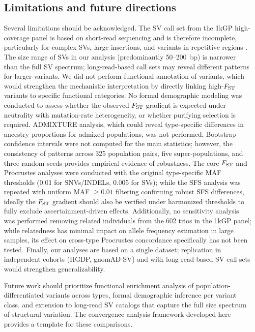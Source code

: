 \subsection*{Limitations and future directions}

Several limitations should be acknowledged. The SV call set from the 1kGP high-coverage panel is based on short-read sequencing and is therefore incomplete, particularly for complex SVs, large insertions, and variants in repetitive regions \citep{ho2020}. The size range of SVs in our analysis (predominantly 50--200~bp) is narrower than the full SV spectrum; long-read-based call sets may reveal different patterns for larger variants. We did not perform functional annotation of variants, which would strengthen the mechanistic interpretation by directly linking high-$F_\mathrm{ST}$ variants to specific functional categories. No formal demographic modeling was conducted to assess whether the observed $F_\mathrm{ST}$ gradient is expected under neutrality with mutation-rate heterogeneity, or whether purifying selection is required. ADMIXTURE analysis, which could reveal type-specific differences in ancestry proportions for admixed populations, was not performed. Bootstrap confidence intervals were not computed for the main statistics; however, the consistency of patterns across 325 population pairs, five super-populations, and three random seeds provides empirical evidence of robustness. The core $F_\mathrm{ST}$ and Procrustes analyses were conducted with the original type-specific MAF thresholds (0.01 for SNVs/INDELs, 0.005 for SVs); while the SFS analysis was repeated with uniform MAF $\geq 0.01$ filtering confirming robust SFS differences, ideally the $F_\mathrm{ST}$ gradient should also be verified under harmonized thresholds to fully exclude ascertainment-driven effects. Additionally, no sensitivity analysis was performed removing related individuals from the 602 trios in the 1kGP panel; while relatedness has minimal impact on allele frequency estimation in large samples, its effect on cross-type Procrustes concordance specifically has not been tested. Finally, our analyses are based on a single dataset; replication in independent cohorts (HGDP, gnomAD-SV) and with long-read-based SV call sets would strengthen generalizability.

Future work should prioritize functional enrichment analysis of population-differentiated variants across types, formal demographic inference per variant class, and extension to long-read SV catalogs that capture the full size spectrum of structural variation. The convergence analysis framework developed here provides a template for these comparisons.
